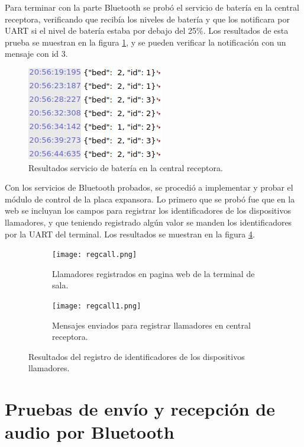 Para terminar con la parte Bluetooth se probó el servicio de batería en la central receptora, verificando que recibía los niveles de batería y que los notificara por UART si el nivel de batería estaba por debajo del 25\%. Los resultados de esta prueba se muestran en la figura \ref{fig:Pbas2}, y se pueden verificar la notificación con un mensaje con id 3.

\begin{figure}[htpb]
	\centering
	\includegraphics[scale=0.7]{./Figures/Pbas2.png}	
	\caption{Resultados servicio de batería en la central receptora.}
	\label{fig:Pbas2}
\end{figure}

Con los servicios de Bluetooth probados, se procedió a implementar y probar el módulo de control de la placa expansora. Lo primero que se probó fue que en la web se incluyan los campos para registrar los identificadores de los dispositivos llamadores, y que teniendo registrado algún valor se manden los identificadores por la UART del terminal. Los resultados se muestran en la figura \ref{fig:Pllam}.

\begin{figure}[htpb]
	\centering
   	\begin{subfigure}[b]{1\textwidth}
   		\centering
      	\texttt{[image: regcall.png]}
      	\caption{Llamadores registrados en pagina web de la terminal de sala.}
      	\label{fig:PllamA}
   	\end{subfigure}%
   	\newline
   	\newline
   	\begin{subfigure}[b]{1\textwidth}
   		\centering
      	\texttt{[image: regcall1.png]}
      	\caption{Mensajes enviados para registrar llamadores en central receptora.}
      	\label{fig:PllamB}
   	\end{subfigure}%
	\caption{Resultados del registro de identificadores de los dispositivos llamadores.}
	\label{fig:Pllam}
\end{figure}

\section{Pruebas de envío y recepción de audio por Bluetooth}
\label{sec:pruebasACS}

